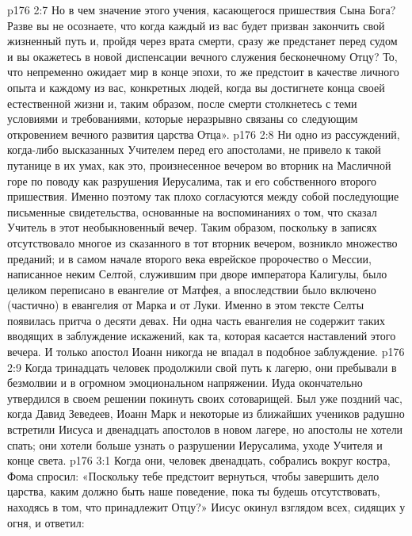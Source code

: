 \vs p176 2:7 Но в чем значение этого учения, касающегося пришествия Сына Бога? Разве вы не осознаете, что когда каждый из вас будет призван закончить свой жизненный путь и, пройдя через врата смерти, сразу же предстанет перед судом и вы окажетесь в новой диспенсации вечного служения бесконечному Отцу? То, что непременно ожидает мир в конце эпохи, то же предстоит в качестве личного опыта и каждому из вас, конкретных людей, когда вы достигнете конца своей естественной жизни и, таким образом, после смерти столкнетесь с теми условиями и требованиями, которые неразрывно связаны со следующим откровением вечного развития царства Отца».
\vs p176 2:8 Ни одно из рассуждений, когда\hyp{}либо высказанных Учителем перед его апостолами, не привело к такой путанице в их умах, как это, произнесенное вечером во вторник на Масличной горе по поводу как разрушения Иерусалима, так и его собственного второго пришествия. Именно поэтому так плохо согласуются между собой последующие письменные свидетельства, основанные на воспоминаниях о том, что сказал Учитель в этот необыкновенный вечер. Таким образом, поскольку в записях отсутствовало многое из сказанного в тот вторник вечером, возникло множество преданий; и в самом начале второго века еврейское пророчество о Мессии, написанное неким Селтой, служившим при дворе императора Калигулы, было целиком переписано в евангелие от Матфея, а впоследствии было включено (частично) в евангелия от Марка и от Луки. Именно в этом тексте Селты появилась притча о десяти девах. Ни одна часть евангелия не содержит таких вводящих в заблуждение искажений, как та, которая касается наставлений этого вечера. И только апостол Иоанн никогда не впадал в подобное заблуждение.
\vs p176 2:9 Когда тринадцать человек продолжили свой путь к лагерю, они пребывали в безмолвии и в огромном эмоциональном напряжении. Иуда окончательно утвердился в своем решении покинуть своих сотоварищей. Был уже поздний час, когда Давид Зеведеев, Иоанн Марк и некоторые из ближайших учеников радушно встретили Иисуса и двенадцать апостолов в новом лагере, но апостолы не хотели спать; они хотели больше узнать о разрушении Иерусалима, уходе Учителя и конце света.
\vs p176 3:1 Когда они, человек двенадцать, собрались вокруг костра, Фома спросил: «Поскольку тебе предстоит вернуться, чтобы завершить дело царства, каким должно быть наше поведение, пока ты будешь отсутствовать, находясь в том, что принадлежит Отцу?» Иисус окинул взглядом всех, сидящих у огня, и ответил:
